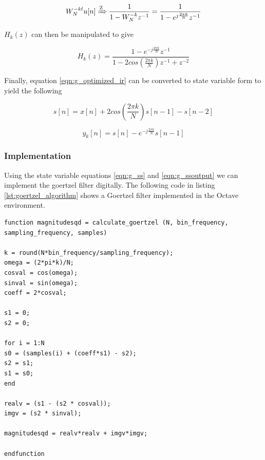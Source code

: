 \begin{equation}
W_N^{-kl}u[n] \xRightarrow{\text{Z}} \frac{1}{1 - W_N^{-k}z^{-1}} = \frac{1}{1 - e^{j\frac{2\pi k}{N}}z^{-1}}
\end{equation}

$H_k(z)$ can then be manipulated to give

\begin{equation}
\label{eqn:g_optimized_ir}
H_k(z) = \frac{1 - e^{-j\frac{2\pi k}{N}}z^{-1}}{1 - 2cos(\frac{2\pi k}{N})z^{-1} + z^{-2}}
\end{equation}

Finally, equation \ref{eqn:g_optimized_ir} can be converted to state variable form to yield the following


\begin{equation}
\label{eqn:g_ss}
s[n] = x[n]+2cos(\frac{2\pi k}{N})s[n-1]-s[n-2]
\end{equation}


\begin{equation}
\label{eqn:g_ssoutput}
y_k[n] = s[n]-e^{-j\frac{2\pi k}{N}}s[n-1]
\end{equation}



\subsubsection{Implementation}
\label{sec:goertzel_implementation}
Using the state variable equations \ref{eqn:g_ss} and \ref{eqn:g_ssoutput} we can implement the goertzel filter digitally. The following code in listing \ref{lst:goertzel_algorithm} shows a Goertzel filter implemented in the Octave environment.

\begin{lstlisting}[caption={Goertzel Algorithm - Octave Implementation\label{lst:goertzel_algorithm}}]
function magnitudesqd = calculate_goertzel (N, bin_frequency, sampling_frequency, samples)

k = round(N*bin_frequency/sampling_frequency);
omega = (2*pi*k)/N;
cosval = cos(omega);
sinval = sin(omega);
coeff = 2*cosval;

s1 = 0;
s2 = 0;

for i = 1:N
s0 = (samples(i) + (coeff*s1) - s2);
s2 = s1;
s1 = s0;    
end

realv = (s1 - (s2 * cosval));
imgv = (s2 * sinval);  

magnitudesqd = realv*realv + imgv*imgv;

endfunction
\end{lstlisting}









